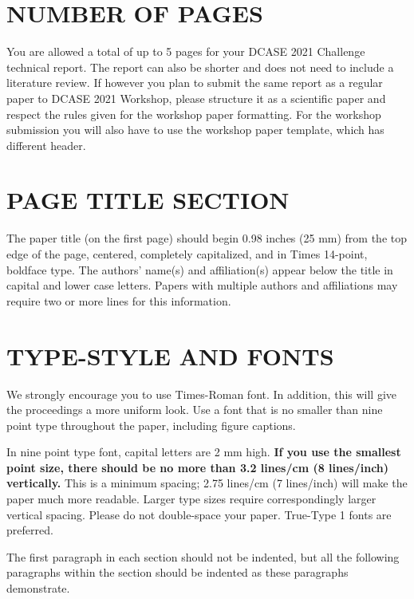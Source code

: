 \documentclass{article}
\begin{document}
\begin{sloppy}
\section{NUMBER OF PAGES}
\label{sec:pagelimit}

You are allowed a total of up to 5 pages for your DCASE 2021 Challenge technical report. The report can also be shorter and does not need to include a literature review. If however you plan to submit the same report as a regular paper to DCASE 2021 Workshop, please structure it as a scientific paper and respect the rules given for the workshop paper formatting. 
For the workshop submission you will also have to use the workshop paper template, which has different header.

\section{PAGE TITLE SECTION}
\label{sec:pagestyle}

The paper title (on the first page) should begin 0.98 inches (25 mm) from the top edge of the page, centered, completely capitalized, and in Times 14-point, boldface type. The authors' name(s) and affiliation(s) appear below the title in capital and lower case letters.  Papers with multiple authors and affiliations may require two or more lines for this information.

\section{TYPE-STYLE AND FONTS}
\label{sec:typestyle}

We strongly encourage you to use Times-Roman font. In addition, this will give the proceedings a more uniform look. Use a font that is no smaller than nine point type throughout the paper, including figure captions.

In nine point type font, capital letters are 2 mm high. {\bf If you use the smallest point size, there should be no more than 3.2 lines/cm (8 lines/inch) vertically.} This is a minimum spacing; 2.75 lines/cm (7 lines/inch) will make the paper much more readable. Larger type sizes require correspondingly larger vertical spacing. Please do not double-space your paper. True-Type 1 fonts are preferred.

The first paragraph in each section should not be indented, but all the following paragraphs within the section should be indented as these paragraphs demonstrate.


\end{sloppy}
\end{document}
